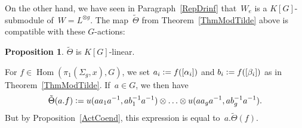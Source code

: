 \documentclass[12pt]{article}
\makeatletter
\theoremstyle{definition}
\newtheorem{Proposition}[Satz]{Proposition}
\theoremstyle{break}
\renewenvironment{proof}[1][\proofname]{\par
\vspace{-5pt}%
\pushQED{\qed}%
\normalfont
\topsep0pt \partopsep0pt %
\trivlist
\item[\hskip\labelsep
\bfseries
#1\@addpunct{.}]\ignorespaces
}{%
\popQED\endtrivlist\@endpefalse
\addvspace{6pt plus 6pt} %
}
\DeclareMathOperator\Hom{Hom}
\renewcommand{\1}{\mathbbm{1}}
\newcommand{\ot}{\mathbin{\otimes}}
\newcommand{\uu}{u}
\newcommand{\deq}{\vcentcolon =}
\makeatother
\begin{document}
On the other hand, we have seen in Paragraph~\ref{RepDrinf} that~$W_e$ is a $K[G]$-submodule of~$W = L^{\ot g}$. The map~$\tilde{\Theta}$ from Theorem~\ref{ThmModTilde} above is compatible with these \mbox{$G$-actions}:
\begin{Proposition} \label{GLin}
$\tilde{\Theta}$ is $K[G]$-linear.
\end{Proposition}
\begin{proof}
For \mbox{$f \in \Hom(\pi_1(\Sigma_{g},x),G)$}, we set
$a_i \deq f([\alpha_i])$ and $b_i \deq f([\beta_i])$ as in Theorem~\ref{ThmModTilde}. If~$a \in G$, we then have
\[\tilde{\Theta}(a.f) \deq \uu(a a_1 a^{-1}, a b_1^{-1} a^{-1}) \ot \dots
\ot \uu(a a_g a^{-1}, a b_g^{-1} a^{-1}).\]
But by Proposition~\ref{ActCoend}, this expression is equal to~$a.\tilde{\Theta}(f)$.
\end{proof}
\end{document}
